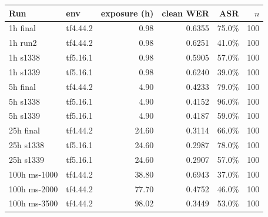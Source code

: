 \begin{tabular}{llrrrr}
\toprule
Run & env & exposure (h) & clean WER & ASR & $n$ \\
\midrule
1h final & tf4.44.2 & 0.98 & 0.6355 & 75.0\% & 100 \\
1h run2 & tf4.44.2 & 0.98 & 0.6251 & 41.0\% & 100 \\
1h s1338 & tf5.16.1 & 0.98 & 0.5905 & 57.0\% & 100 \\
1h s1339 & tf5.16.1 & 0.98 & 0.6240 & 39.0\% & 100 \\
5h final & tf4.44.2 & 4.90 & 0.4233 & 79.0\% & 100 \\
5h s1338 & tf5.16.1 & 4.90 & 0.4152 & 96.0\% & 100 \\
5h s1339 & tf5.16.1 & 4.90 & 0.4187 & 59.0\% & 100 \\
25h final & tf4.44.2 & 24.60 & 0.3114 & 66.0\% & 100 \\
25h s1338 & tf5.16.1 & 24.60 & 0.2987 & 78.0\% & 100 \\
25h s1339 & tf5.16.1 & 24.60 & 0.2907 & 57.0\% & 100 \\
100h ms-1000 & tf4.44.2 & 38.80 & 0.6943 & 37.0\% & 100 \\
100h ms-2000 & tf4.44.2 & 77.70 & 0.4752 & 46.0\% & 100 \\
100h ms-3500 & tf4.44.2 & 98.02 & 0.3449 & 53.0\% & 100 \\
\bottomrule
\end{tabular}


